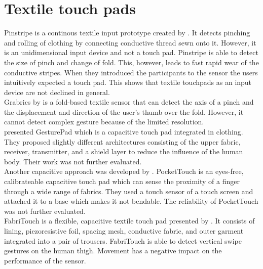 \section{Textile touch pads}
Pinstripe is a continous textile input prototype created by \cite{Karrer:2010:PEC:1866218.1866255}. It detects pinching and rolling of clothing by connecting conductive thread sewn onto it. However, it is an unidimensional input device and not a touch pad. Pinstripe is able to detect the size of pinch and change of fold. This, however, leads to fast rapid wear of the conductive stripes. When they introduced the participants to the sensor the users intuitively expected a touch pad. This shows that  textile touchpads as an input device are not declined in general. \\
Grabrics by \cite{hamdan} is a fold-based textile sensor that can detect the axis of a pinch and the displacement and direction of the user's thumb over the fold. However, it cannot detect complex gesture because of the limited resolution.\\
\cite{Rekimoto:2001:962092} presented GesturePad which is a capacitive touch pad integrated in clothing. They proposed slightly different architectures consisting of the upper fabric, receiver, transmitter, and a shield layer to reduce the influence of the human body. Their work was not further evaluated. \\
Another capacitive approach was developed by \cite{Saponas:2011:PTC:2047196.2047235}. PocketTouch is an eyes-free, calibrateable capacitive touch pad which can sense the proximity of a finger through a wide range of fabrics. They used a touch sensor of a touch screen and attached it to a base which makes it not bendable. The reliability of PocketTouch was not further evaluated. \\
FabriTouch is a flexible, capacitive textile touch pad presented by \cite{Heller:2014:FEF:2634317.2634345}. It consists of lining, piezoresistive foil, spacing mesh, conductive fabric, and outer garment integrated into a pair of trousers. FabriTouch is able to detect vertical swipe gestures on the human thigh. Movement has a negative impact on the performance of the sensor.
